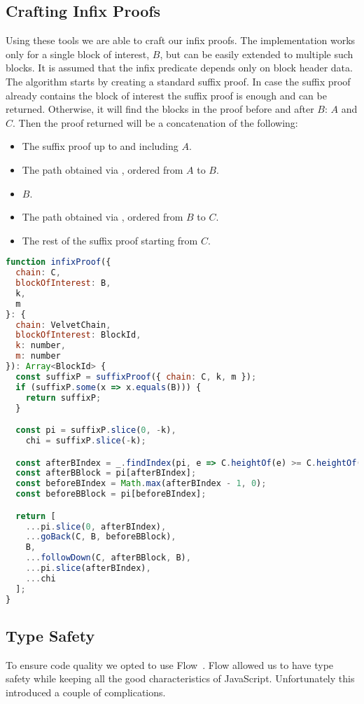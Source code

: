 \subsection{Crafting Infix Proofs}
Using these tools we are able to craft our infix proofs. The implementation works only for a single block of interest, $B$, but can be easily extended to multiple such blocks. It is assumed that the infix predicate depends only on block header data. The algorithm starts by creating a standard suffix proof. In case the suffix proof already contains the block of interest the suffix proof is enough and can be returned. Otherwise, it will find the blocks in the proof before and after $B$: $A$ and $C$. Then the proof returned will be a concatenation of the following:

\begin{itemize}
  \item The suffix proof up to and including $A$.
  \item The path obtained via , ordered from $A$ to $B$.
  \item $B$.
  \item The path obtained via , ordered from $B$ to $C$.
  \item The rest of the suffix proof starting from $C$.
\end{itemize}

\begin{lstlisting}[language=Javascript]
function infixProof({
  chain: C,
  blockOfInterest: B,
  k,
  m
}: {
  chain: VelvetChain,
  blockOfInterest: BlockId,
  k: number,
  m: number
}): Array<BlockId> {
  const suffixP = suffixProof({ chain: C, k, m });
  if (suffixP.some(x => x.equals(B))) {
    return suffixP;
  }

  const pi = suffixP.slice(0, -k),
    chi = suffixP.slice(-k);

  const afterBIndex = _.findIndex(pi, e => C.heightOf(e) >= C.heightOf(B));
  const afterBBlock = pi[afterBIndex];
  const beforeBIndex = Math.max(afterBIndex - 1, 0);
  const beforeBBlock = pi[beforeBIndex];

  return [
    ...pi.slice(0, afterBIndex),
    ...goBack(C, B, beforeBBlock),
    B,
    ...followDown(C, afterBBlock, B),
    ...pi.slice(afterBIndex),
    ...chi
  ];
}
\end{lstlisting}

\subsection{Type Safety}
To ensure code quality we opted to use Flow~\cite{flow}. Flow allowed us to have type safety while keeping all the good characteristics of JavaScript. Unfortunately this introduced a couple of complications.


